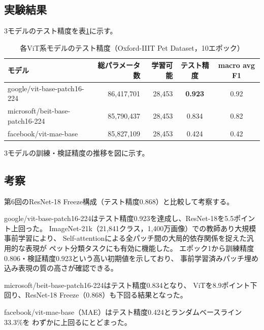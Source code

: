 \documentclass[twoside,11pt]{article}
\begin{document}
\subsection*{実験結果}

3モデルのテスト精度を表\ref{tab:vit_result}に示す。

\begin{table}[H]
\centering
\caption{各ViT系モデルのテスト精度（Oxford-IIIT Pet Dataset，10エポック）}
\label{tab:vit_result}
\begin{tabular}{lrrcc}
\toprule
モデル & 総パラメータ数 & 学習可能 & テスト精度 & macro avg F1 \\
\midrule
google/vit-base-patch16-224     & 86,417,701 & 28,453 & \textbf{0.923} & 0.92 \\
microsoft/beit-base-patch16-224 & 85,790,437 & 28,453 & 0.834 & 0.82 \\
facebook/vit-mae-base           & 85,827,109 & 28,453 & 0.424 & 0.42 \\
\bottomrule
\end{tabular}
\end{table}

3モデルの訓練・検証精度の推移を図に示す。

\subsection*{考察}

第6回のResNet-18 Freeze構成（テスト精度0.868）と比較して考察する。

google/vit-base-patch16-224はテスト精度0.923を達成し、ResNet-18を5.5ポイント上回った。
ImageNet-21k（21,841クラス，1,400万画像）での教師あり大規模事前学習により、
Self-attentionによる全パッチ間の大局的依存関係を捉えた汎用的な表現が
ペット分類タスクにも有効に機能した。
エポック1から訓練精度0.806・検証精度0.923という高い初期値を示しており、
事前学習済みパッチ埋め込み表現の質の高さが確認できる。

microsoft/beit-base-patch16-224はテスト精度0.834となり、
ViTを8.9ポイント下回り、ResNet-18 Freeze（0.868）も下回る結果となった。

facebook/vit-mae-base（MAE）はテスト精度0.424とランダムベースライン33.3\%を
わずかに上回るにとどまった。
\end{document}
